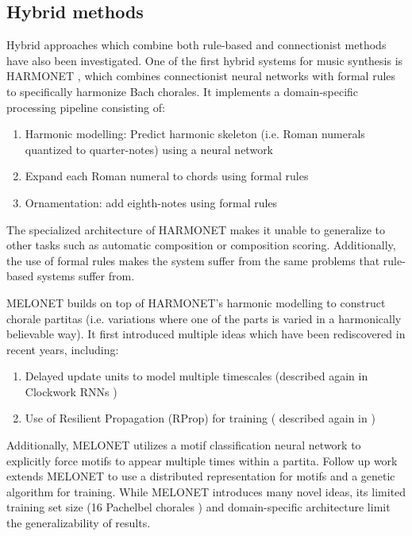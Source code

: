 \documentclass[dissertation.tex]{subfiles}
\begin{document}
\subsection{Hybrid methods}

Hybrid approaches which combine both rule-based and connectionist methods have
also been investigated. One of the first hybrid systems for music synthesis is
HARMONET \cite{hild1991harmonet}, which combines connectionist neural networks
with formal rules to specifically harmonize Bach chorales. It implements a
domain-specific processing pipeline consisting of:
\begin{enumerate}
  \item Harmonic modelling: Predict harmonic skeleton (i.e. Roman numerals
  quantized to quarter-notes) using a neural network
  \item Expand each Roman numeral to chords using formal rules
  \item Ornamentation: add eighth-notes using formal rules
\end{enumerate}
The specialized architecture of HARMONET makes it unable to generalize
to other tasks such as automatic composition or composition scoring.
Additionally, the use of formal rules makes the system suffer from the same
problems that rule-based systems suffer from.

MELONET \cite{feulner1994melonet} builds on top of HARMONET's harmonic
modelling to construct chorale partitas (i.e. variations where one of the
parts is varied in a harmonically believable way). It first introduced multiple
ideas which have been rediscovered in recent years, including:
\begin{enumerate}
  \item Delayed update units to model multiple timescales (described again in Clockwork
  RNNs \cite{Koutnik2014})
  \item Use of Resilient Propagation (RProp) \cite{riedmiller1993direct} for training (
  described again in \cite{Liu2014})
\end{enumerate}
Additionally, MELONET utilizes a motif classification neural network to
explicitly force motifs to appear multiple times within a partita.
Follow up work \cite{hornel1996learning} extends MELONET to use a distributed
representation for motifs and a genetic algorithm for training.
While MELONET introduces many novel ideas, its limited training set size
(16 Pachelbel chorales \cite{hornel1997melonet}) and domain-specific
architecture limit the generalizability of results. 
\end{document}
